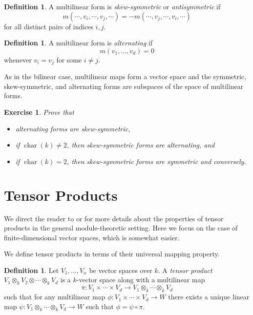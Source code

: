 \documentclass[12pt]{article}
\theoremstyle{plain}
\newtheorem{exercise}[theorem]{Exercise}
\theoremstyle{definition}
\newtheorem{definition}[theorem]{Definition}
\theoremstyle{remark}
\numberwithin{equation}{section}
\begin{document}
\begin{definition}
A multilinear form is \emph{skew-symmetric} or \emph{antisymmetric} if
\[
m(\cdots,v_i,\cdots,v_j,\cdots) = -m(\cdots,v_j,\cdots,v_i,\cdots)
\]
for all distinct pairs of indices $i,j$.
\end{definition}

\begin{definition}
A multilinear form is \emph{alternating} if
\[
m(v_1,\ldots,v_d) = 0
\]
whenever $v_i=v_j$ for some $i \ne j$.
\end{definition}

As in the bilinear case, multilinear maps form a vector space and the
symmetric, skew-symmetric, and alternating forms are subspaces of the
space of multilinear forms.

\begin{exercise}
Prove that
\begin{itemize}
\item alternating forms are skew-symmetric,
\item if $\operatorname{char}(k) \ne 2$, then skew-symmetric forms are
alternating, and
\item if $\operatorname{char}(k) = 2$, then skew-symmetric forms are
symmetric and conversely.
\end{itemize}
\end{exercise}

\section{Tensor Products}

We direct the reader to \cite[10.4]{DF} or \cite[XVI]{Lang}
for more details about the properties of tensor products in the general
module-theoretic setting.
Here we focus on the case of finite-dimensional vector spaces,
which is somewhat easier.

We define tensor products in terms of their universal mapping property.

\begin{definition}
Let $V_1,\ldots, V_n$ be vector spaces over $k$.
A \emph{tensor product} $V_1 \otimes_k V_2 \otimes \cdots \otimes_k V_d$
is a $k$-vector space along with a multilinear map
\[
\pi : V_1 \times \cdots \times V_d
\to  V_1 \otimes_k \cdots \otimes_k V_d
\]
such that for any multilinear map $\phi : V_1 \times \cdots \times V_d
\to W$ there exists a unique linear map
$\psi : V_1 \otimes_k \cdots \otimes_k V_d \to W$ such that
$\phi = \psi \circ \pi$.
\end{definition}
\end{document}
